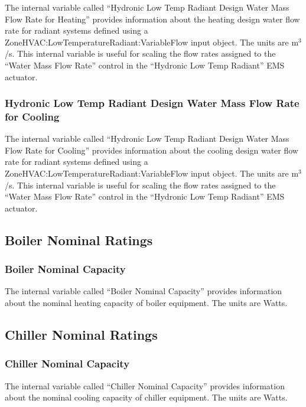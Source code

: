 The internal variable called ``Hydronic Low Temp Radiant Design Water Mass Flow Rate for Heating'' provides information about the heating design water flow rate for radiant systems defined using a ZoneHVAC:LowTemperatureRadiant:VariableFlow input object. The units are m\(^{3}\)/s. This internal variable is useful for scaling the flow rates assigned to the ``Water Mass Flow Rate'' control in the ``Hydronic Low Temp Radiant'' EMS actuator.

\subsubsection{Hydronic Low Temp Radiant Design Water Mass Flow Rate for Cooling}\label{hydronic-low-temp-radiant-design-water-mass-flow-rate-for-cooling}

The internal variable called ``Hydronic Low Temp Radiant Design Water Mass Flow Rate for Cooling'' provides information about the cooling design water flow rate for radiant systems defined using a ZoneHVAC:LowTemperatureRadiant:VariableFlow input object. The units are m\(^{3}\)/s. This internal variable is useful for scaling the flow rates assigned to the ``Water Mass Flow Rate'' control in the ``Hydronic Low Temp Radiant'' EMS actuator.

\subsection{Boiler Nominal Ratings}\label{boiler-nominal-ratings}

\subsubsection{Boiler Nominal Capacity}\label{boiler-nominal-capacity}

The internal variable called ``Boiler Nominal Capacity'' provides information about the nominal heating capacity of boiler equipment. The units are Watts.

\subsection{Chiller Nominal Ratings}\label{chiller-nominal-ratings}

\subsubsection{Chiller Nominal Capacity}\label{chiller-nominal-capacity}

The internal variable called ``Chiller Nominal Capacity'' provides information about the nominal cooling capacity of chiller equipment. The units are Watts.

